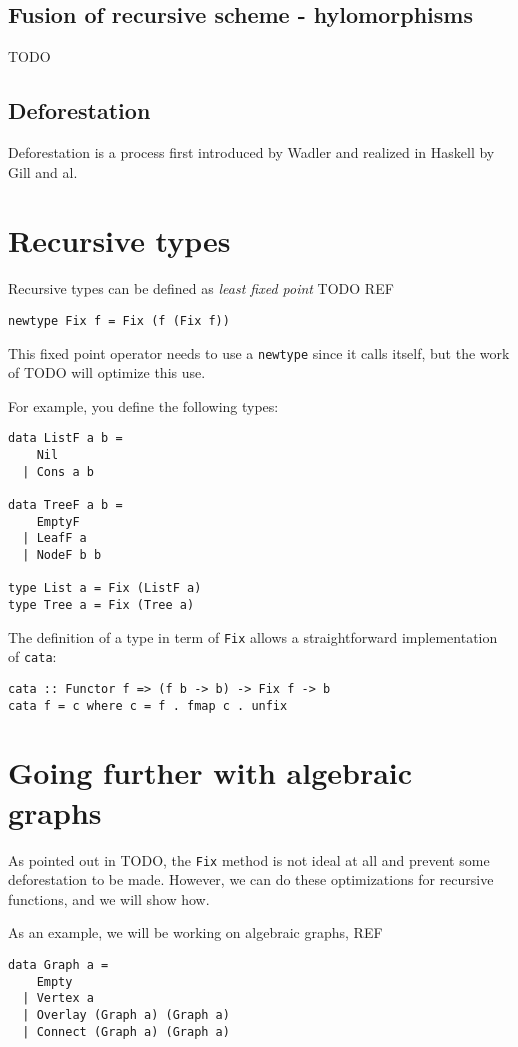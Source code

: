 \documentclass[sigplan]{acmart}
\begin{document}
\subsection{Fusion of recursive scheme - hylomorphisms}
TODO

\subsection{Deforestation}
Deforestation is a process first introduced by Wadler \cite{WADLER1990231} and realized in Haskell by Gill and al. \cite{Gill:1993:SCD:165180.165214}

\section{Recursive types}
Recursive types can be defined as \emph{least fixed point} TODO REF
\begin{verbatim}
newtype Fix f = Fix (f (Fix f))
\end{verbatim}
This fixed point operator needs to use a \verb|newtype| since it calls itself, but the work of TODO will optimize this use.

For example, you define the following types:
\begin{verbatim}
data ListF a b =
    Nil
  | Cons a b
  
data TreeF a b =
    EmptyF
  | LeafF a
  | NodeF b b
  
type List a = Fix (ListF a)
type Tree a = Fix (Tree a)
\end{verbatim}

The definition of a type in term of \verb|Fix| allows a straightforward implementation of \verb|cata|:
\begin{verbatim}
cata :: Functor f => (f b -> b) -> Fix f -> b
cata f = c where c = f . fmap c . unfix
\end{verbatim}

\section{Going further with algebraic graphs}
As pointed out in TODO, the \verb|Fix| method is not ideal at all and prevent some deforestation to be made.
However, we can do these optimizations for recursive functions, and we will show how.

As an example, we will be working on algebraic graphs, REF
\begin{verbatim}
data Graph a =
    Empty
  | Vertex a
  | Overlay (Graph a) (Graph a)
  | Connect (Graph a) (Graph a)
\end{verbatim}
\end{document}
